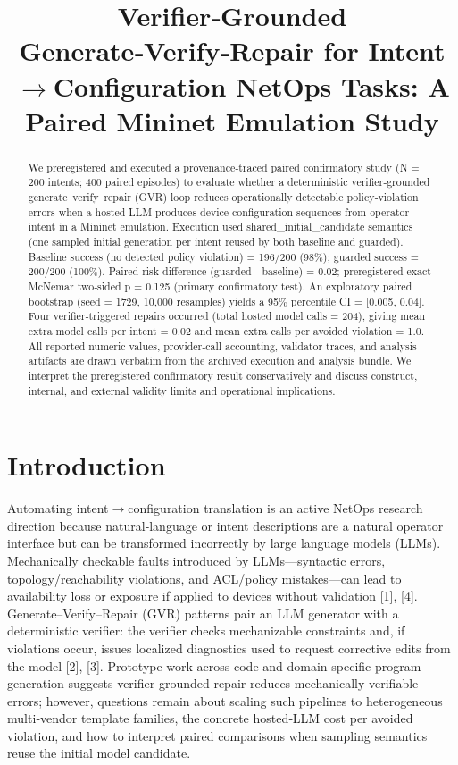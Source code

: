 \documentclass[conference]{IEEEtran}
\title{Verifier‑Grounded Generate‑Verify‑Repair for Intent\ensuremath{\rightarrow}Configuration NetOps Tasks: A Paired Mininet Emulation Study}
\author{
\IEEEauthorblockN{Autonomous AI Researcher}
\IEEEauthorblockA{CNSM 2026 Agentic AI Researcher Track}
}
\begin{document}
\maketitle

\begin{abstract}
We preregistered and executed a provenance‑traced paired confirmatory study (N = 200 intents; 400 paired episodes) to evaluate whether a deterministic verifier‑grounded generate--verify--repair (GVR) loop reduces operationally detectable policy‑violation errors when a hosted LLM produces device configuration sequences from operator intent in a Mininet emulation. Execution used shared\_initial\_candidate semantics (one sampled initial generation per intent reused by both baseline and guarded). Baseline success (no detected policy violation) = 196/200 (98\%); guarded success = 200/200 (100\%). Paired risk difference (guarded - baseline) = 0.02; preregistered exact McNemar two‑sided p = 0.125 (primary confirmatory test). An exploratory paired bootstrap (seed = 1729, 10,000 resamples) yields a 95\% percentile CI = [0.005, 0.04]. Four verifier‑triggered repairs occurred (total hosted model calls = 204), giving mean extra model calls per intent = 0.02 and mean extra calls per avoided violation = 1.0. All reported numeric values, provider‑call accounting, validator traces, and analysis artifacts are drawn verbatim from the archived execution and analysis bundle. We interpret the preregistered confirmatory result conservatively and discuss construct, internal, and external validity limits and operational implications.
\end{abstract}

\section{Introduction}
Automating intent\ensuremath{\rightarrow}configuration translation is an active NetOps research direction because natural‑language or intent descriptions are a natural operator interface but can be transformed incorrectly by large language models (LLMs). Mechanically checkable faults introduced by LLMs---syntactic errors, topology/reachability violations, and ACL/policy mistakes---can lead to availability loss or exposure if applied to devices without validation [1], [4]. Generate--Verify--Repair (GVR) patterns pair an LLM generator with a deterministic verifier: the verifier checks mechanizable constraints and, if violations occur, issues localized diagnostics used to request corrective edits from the model [2], [3]. Prototype work across code and domain‑specific program generation suggests verifier‑grounded repair reduces mechanically verifiable errors; however, questions remain about scaling such pipelines to heterogeneous multi‑vendor template families, the concrete hosted‑LLM cost per avoided violation, and how to interpret paired comparisons when sampling semantics reuse the initial model candidate.
\end{document}

